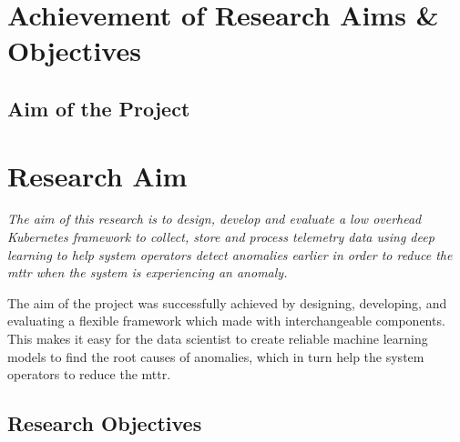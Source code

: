 \section{Achievement of Research Aims \& Objectives}

\subsection{Aim of the Project}

\section{Research Aim}

\textit{The aim of this research is to design, develop and evaluate a low overhead Kubernetes framework to collect, store and process telemetry data using deep learning to help system operators detect anomalies earlier in order to reduce the \ac{mttr} when the system is experiencing an anomaly.}

The aim of the project was successfully achieved by designing, developing, and evaluating a flexible framework which made with interchangeable components. This makes it easy for the data scientist to create reliable machine learning models to find the root causes of anomalies, which in turn help the system operators to reduce the \ac{mttr}.


\subsection{Research Objectives}

